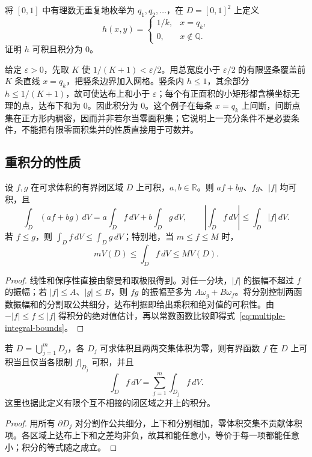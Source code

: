 \begin{example}
\label{ex:multiple-dense-line-discontinuities}
将 $[0,1]$ 中有理数无重复地枚举为 $q_1,q_2,\ldots$，在 $D=[0,1]^2$ 上定义
\[
    h(x,y)=\begin{cases}1/k,&x=q_k,\\0,&x\notin\mathbb Q.\end{cases}
\]
证明 $h$ 可积且积分为 $0$。
\end{example}
\begin{solve}
给定 $\varepsilon>0$，先取 $K$ 使 $1/(K+1)<\varepsilon/2$。用总宽度小于 $\varepsilon/2$ 的有限竖条覆盖前 $K$ 条直线 $x=q_k$，把竖条边界加入网格。竖条内 $h\leq1$，其余部分 $h\leq1/(K+1)$，故可使达布上和小于 $\varepsilon$；每个有正面积的小矩形都含横坐标无理的点，达布下和为 $0$。因此积分为 $0$。这个例子在每条 $x=q_k$ 上间断，间断点集在正方形内稠密，因而并非若尔当零面积集；它说明上一充分条件不是必要条件，不能把有限零面积集并的性质直接用于可数并。
\end{solve}

\subsection{重积分的性质}
\label{subsec:properties-of-multiple-integrals}

\begin{theorem}
\label{thm:multiple-integral-algebra-order}
设 $f,g$ 在可求体积的有界闭区域 $D$ 上可积，$a,b\in\mathbb R$。则 $af+bg$、$fg$、$|f|$ 均可积，且
\[
    \int_D(af+bg)\,dV=a\int_Df\,dV+b\int_Dg\,dV,
    \qquad
    \left|\int_Df\,dV\right|\leq\int_D|f|\,dV.
\]
若 $f\leq g$，则 $\int_Df\,dV\leq\int_Dg\,dV$；特别地，当 $m\leq f\leq M$ 时，
\begin{equation}
    mV(D)\leq\int_Df\,dV\leq MV(D).
    \label{eq:multiple-integral-bounds}
\end{equation}
\end{theorem}
\begin{proof}
线性和保序性直接由黎曼和取极限得到。对任一分块，$|f|$ 的振幅不超过 $f$ 的振幅；若 $|f|\leq A$、$|g|\leq B$，则 $fg$ 的振幅至多为 $A\omega_g+B\omega_f$。将分别控制两函数振幅和的分割取公共细分，达布判据即给出乘积和绝对值的可积性。由 $-|f|\leq f\leq|f|$ 得积分的绝对值估计，再以常数函数比较即得式~\eqref{eq:multiple-integral-bounds}。
\end{proof}

\begin{proposition}
\label{prop:multiple-domain-additivity}
若 $D=\bigcup_{j=1}^mD_j$，各 $D_j$ 可求体积且两两交集体积为零，则有界函数 $f$ 在 $D$ 上可积当且仅当各限制 $f|_{D_j}$ 可积，并且
\begin{equation}
    \int_Df\,dV=\sum_{j=1}^m\int_{D_j}f\,dV.
    \label{eq:multiple-domain-additivity}
\end{equation}
这里也据此定义有限个互不相接的闭区域之并上的积分。
\end{proposition}
\begin{proof}
用所有 $\partial D_j$ 对分割作公共细分，上下和分别相加，零体积交集不贡献体积项。各区域上达布上下和之差均非负，故其和能任意小，等价于每一项都能任意小；积分的等式随之成立。
\end{proof}

